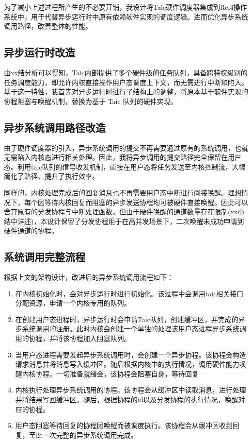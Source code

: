 为了减小上述过程所产生的不必要开销，我设计将Taic硬件调度器集成到Rel4操作系统中，用于代替异步运行时中原有依赖软件实现的调度逻辑。进而优化异步系统调用路径，改善整体的性能。

\subsection{异步运行时改造}

由xx结分析可以得知，Taic内部提供了多个硬件级的任务队列，具备跨特权级别的任务调度能力，即允许内核直接操作用户态调度上下文，而无需进行中断和陷入。基于这一特性，我首先对异步运行时进行了结构上的调整，将原本基于软件实现的协程阻塞与唤醒机制，替换为基于 Taic 队列的硬件实现。


\subsection{异步系统调用路径改造}

由于硬件调度器的引入，异步系统调用的提交不再需要通过原有的系统调用，也就无需陷入内核态进行相关处理。因此，我将异步调用的提交路径完全保留在用户态。利用taic队列的信号收发机制，直接在用户态将任务发送至内核控制流，大幅简化了路径、提升了执行效率。

同样的，内核处理完成后的回复消息也不再需要用户态中断进行间接唤醒。理想情况下，每个因等待内核回复而阻塞的异步发送协程均可被硬件直接唤醒。因此可以舍弃原有的分发协程与中断处理函数。但由于硬件唤醒的通道数量存在限制(xx小结中详述)，本设计保留了分发协程用于在高并发场景下，二次唤醒未成功申请到硬件通道的协程。

\subsection{系统调用完整流程}

根据上文的架构设计，改进后的异步系统调用流程如下：

\begin{enumerate}
  \item 在内核初始化时，会对异步运行时进行初始化。该过程中会调用taic相关接口分配资源，申请一个内核专用的队列。
  \item 在创建用户态进程时，异步运行时会申请Taic队列，创建缓冲区，并完成的异步系统调用的注册。此时内核会创建一个单独的处理该用户态进程异步系统调用的协程，并将该协程加入阻塞队列。
  \item 当用户态进程需要发起异步系统调用时，会创建一个异步协程。该协程会构造请求消息并将消息写入缓冲区。随后根据内核中的执行情况，调用硬件能力唤醒内核协程。一切准备就绪会，该协程会阻塞自身，等待回复
  \item 内核执行处理异步系统调用的协程。该协程会从缓冲区中读取消息，进行处理并将结果写回缓冲区。随后，根据协程的id以及分发协程的执行情况，唤醒对应的协程。
  \item 用户态阻塞等待回复的协程因唤醒而被调度执行。该协程会从缓冲区收到回复，至此一次完整的异步系统调用完成。
\end{enumerate}

